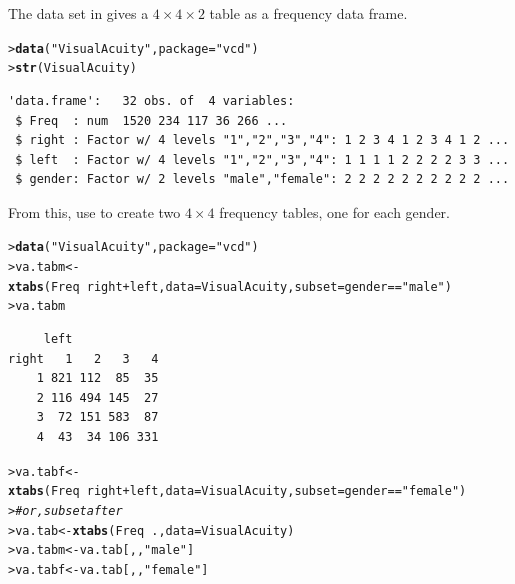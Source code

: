 \documentclass[10pt]{report}\usepackage[]{graphicx}\usepackage[]{color}
\makeatletter
\newcommand{\hlstr}[1]{\textcolor[rgb]{0.192,0.494,0.8}{#1}}%
\newcommand{\hlcom}[1]{\textcolor[rgb]{0.678,0.584,0.686}{\textit{#1}}}%
\newcommand{\hlopt}[1]{\textcolor[rgb]{0,0,0}{#1}}%
\newcommand{\hlstd}[1]{\textcolor[rgb]{0.345,0.345,0.345}{#1}}%
\newcommand{\hlkwb}[1]{\textcolor[rgb]{0.69,0.353,0.396}{#1}}%
\newcommand{\hlkwc}[1]{\textcolor[rgb]{0.333,0.667,0.333}{#1}}%
\newcommand{\hlkwd}[1]{\textcolor[rgb]{0.737,0.353,0.396}{\textbf{#1}}}%
\newenvironment{kframe}{%
 \def\at@end@of@kframe{}%
 \ifinner\ifhmode%
  \def\at@end@of@kframe{\end{minipage}}%
  \begin{minipage}{\columnwidth}%
 \fi\fi%
 \def\FrameCommand##1{\hskip\@totalleftmargin \hskip-\fboxsep
 \colorbox{shadecolor}{##1}\hskip-\fboxsep
     \hskip-\linewidth \hskip-\@totalleftmargin \hskip\columnwidth}%
 \MakeFramed {\advance\hsize-\width
   \@totalleftmargin\z@ \linewidth\hsize
   \@setminipage}}%
 {\par\unskip\endMakeFramed%
 \at@end@of@kframe}
\newenvironment{knitrout}{}{} %
\renewenvironment{knitrout}{\small\renewcommand{\baselinestretch}{.85}}{} %
\makeatother
\begin{document}
\begin{Exercises}
\exercise The data set  in  gives a $4 \times 4 \times 2$
table as a frequency data frame.
\begin{knitrout}\footnotesize
{}\color{fgcolor}\begin{kframe}
\begin{alltt}
\hlstd{> }\hlkwd{data}\hlstd{(}\hlstr{"VisualAcuity"}\hlstd{,} \hlkwc{package} \hlstd{=} \hlstr{"vcd"}\hlstd{)}
\hlstd{> }\hlkwd{str}\hlstd{(VisualAcuity)}
\end{alltt}
\begin{verbatim}
'data.frame':	32 obs. of  4 variables:
 $ Freq  : num  1520 234 117 36 266 ...
 $ right : Factor w/ 4 levels "1","2","3","4": 1 2 3 4 1 2 3 4 1 2 ...
 $ left  : Factor w/ 4 levels "1","2","3","4": 1 1 1 1 2 2 2 2 3 3 ...
 $ gender: Factor w/ 2 levels "male","female": 2 2 2 2 2 2 2 2 2 2 ...
\end{verbatim}
\end{kframe}
\end{knitrout}
  \begin{enumerate*}
    \item From this, use  to create two $4\times 4$ frequency tables, one for
each gender.
    \begin{ans}
\begin{knitrout}\footnotesize
{}\color{fgcolor}\begin{kframe}
\begin{alltt}
\hlstd{> }\hlkwd{data}\hlstd{(}\hlstr{"VisualAcuity"}\hlstd{,} \hlkwc{package}\hlstd{=}\hlstr{"vcd"}\hlstd{)}
\hlstd{> }\hlstd{va.tabm} \hlkwb{<-} \hlkwd{xtabs}\hlstd{(Freq} \hlopt{~} \hlstd{right}\hlopt{+}\hlstd{left,} \hlkwc{data} \hlstd{= VisualAcuity,} \hlkwc{subset}\hlstd{=gender}\hlopt{==}\hlstr{"male"}\hlstd{)}
\hlstd{> }\hlstd{va.tabm}
\end{alltt}
\begin{verbatim}
     left
right   1   2   3   4
    1 821 112  85  35
    2 116 494 145  27
    3  72 151 583  87
    4  43  34 106 331
\end{verbatim}
\begin{alltt}
\hlstd{> }\hlstd{va.tabf} \hlkwb{<-} \hlkwd{xtabs}\hlstd{(Freq} \hlopt{~} \hlstd{right}\hlopt{+}\hlstd{left,} \hlkwc{data} \hlstd{= VisualAcuity,} \hlkwc{subset}\hlstd{=gender}\hlopt{==}\hlstr{"female"}\hlstd{)}
\hlstd{> }\hlcom{# or, subset after}
\hlstd{> }\hlstd{va.tab} \hlkwb{<-} \hlkwd{xtabs}\hlstd{(Freq} \hlopt{~} \hlstd{.,} \hlkwc{data} \hlstd{= VisualAcuity)}
\hlstd{> }\hlstd{va.tabm} \hlkwb{<-} \hlstd{va.tab[,,}\hlstr{"male"}\hlstd{]}
\hlstd{> }\hlstd{va.tabf} \hlkwb{<-} \hlstd{va.tab[,,}\hlstr{"female"}\hlstd{]}
\end{alltt}
\end{kframe}
\end{knitrout}
    \end{ans}


\end{enumerate*}
\end{Exercises}
\end{document}
